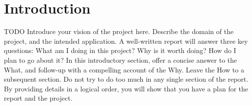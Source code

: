 \chapter{Introduction}

TODO Introduce your vision of the project here. Describe the domain of the project, and the intended application. A well-written report will answer three key questions: What am I doing in this project? Why is it worth doing? How do I plan to go about it? In this introductory section, offer a concise answer to the What, and follow-up with a compelling account of the Why. Leave the How to a subsequent section. Do not try to do too much in any single section of the report. By providing details in a logical order, you will show that you have a plan for the report and the project.
